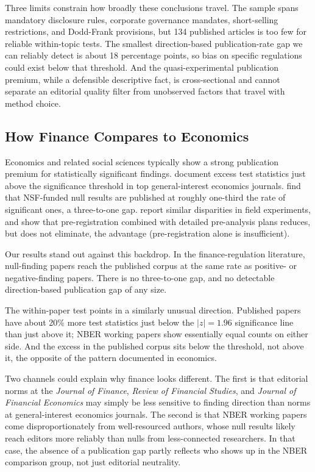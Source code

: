 \documentclass[12pt]{article}
\newcommand{\JF}{\textit{Journal of Finance}}
\newcommand{\RFS}{\textit{Review of Financial Studies}}
\newcommand{\JFE}{\textit{Journal of Financial Economics}}
\begin{document}
Three limits constrain how broadly these conclusions travel.  The
sample spans mandatory disclosure rules, corporate governance
mandates, short-selling restrictions, and Dodd-Frank provisions,
but 134 published articles is too few for reliable within-topic
tests.  The smallest direction-based publication-rate gap we can
reliably detect is about 18 percentage points, so bias on specific
regulations could exist below that threshold.  And the
quasi-experimental publication premium, while a defensible
descriptive fact, is cross-sectional and cannot separate an
editorial quality filter from unobserved factors that travel with
method choice.

\subsection{How Finance Compares to Economics}

Economics and related social sciences typically show a strong
publication premium for statistically significant findings.
\citet*{Brodeur2016} document excess test statistics just above the
significance threshold in top general-interest economics journals.
\citet*{Franco2014} find that NSF-funded null results are published
at roughly one-third the rate of significant ones, a three-to-one
gap.  \citet*{DellaVigna2022} report similar disparities in field
experiments, and \citet*{Brodeur2024} show that pre-registration
combined with detailed pre-analysis plans reduces, but does not
eliminate, the advantage (pre-registration alone is insufficient).

Our results stand out against this backdrop.  In the
finance-regulation literature, null-finding papers reach the
published corpus at the same rate as positive- or negative-finding
papers.  There is no three-to-one gap, and no detectable
direction-based publication gap of any size.

The within-paper test points in a similarly unusual direction.
Published papers have about 20\% more test statistics just below the
$|z|=1.96$ significance line than just above it; NBER working papers
show essentially equal counts on either side.  And the excess in the
published corpus sits below the threshold, not above it, the
opposite of the pattern \citet*{Brodeur2016} documented in economics.

Two channels could explain why finance looks different.  The first is
that editorial norms at the \JF{}, \RFS{}, and \JFE{} may simply be
less sensitive to finding direction than norms at general-interest
economics journals.  The second is that NBER working papers come
disproportionately from well-resourced authors, whose null results
likely reach editors more reliably than nulls from less-connected
researchers.  In that case, the absence of a publication gap partly
reflects who shows up in the NBER comparison group, not just
editorial neutrality.
\end{document}

